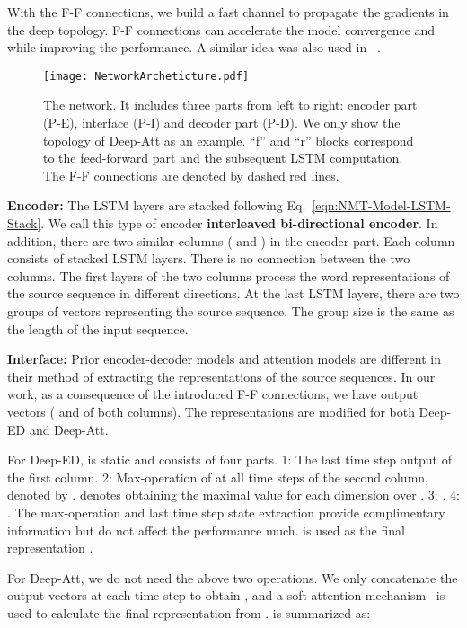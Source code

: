 \documentclass[11pt,letterpaper]{article}
\begin{document}
With the F-F connections, we build a fast channel  to propagate the gradients in the deep topology.  F-F connections can accelerate
the model convergence and while improving the performance. A similar idea was also used in ~\cite{He-Sun-ARXIV2015,Zhou-Xu-ACL2015}.
\begin{figure*}[!htbp]
\begin{center}
\texttt{[image: NetworkArcheticture.pdf]}
\caption{The network. It includes three parts from left to right: encoder part (P-E), interface (P-I) and decoder part (P-D). We only
show the topology of Deep-Att as an example.  ``f'' and ``r'' blocks correspond to the feed-forward part and the subsequent
LSTM computation.    The F-F connections are denoted by dashed red lines.}
\label{fig:NMT-Model-Topology}
\end{center}
\end{figure*}


\noindent\textbf{Encoder:} The LSTM layers are stacked following Eq.~\ref{eqn:NMT-Model-LSTM-Stack}. We call this type of encoder
\textbf{interleaved bi-directional encoder}. In addition, there are two similar columns ( and ) in the encoder part. Each
column consists of  stacked LSTM layers. There is no connection between the two columns. The first layers of the two columns
process the word representations  of the source sequence in different directions. At the last LSTM layers, there are two groups of
vectors representing the source sequence. The group size is the same as the length of the input sequence.

\noindent\textbf{Interface:} Prior encoder-decoder models and attention models are different in their method of
extracting the representations of the source sequences. In our work, as a consequence of the introduced F-F connections, we have 
output vectors ( and  of both columns). The representations are modified for both Deep-ED and Deep-Att.

For Deep-ED,  is static and consists of four \mbox{parts}. 1: The last time step output  of the first column. 2: Max-operation
 of  at \mbox{all} time steps of the second column, denoted by .
 denotes  obtaining the maximal value for each dimension over . 3: . 4:
. The max-operation and last time step state extraction provide complimentary information but do not
affect the performance much.  is  used as the final representation .

For Deep-Att, we do not need the above two operations. We only concatenate the  output vectors at each time step to obtain ,
and a soft attention mechanism~\cite{Bahdanau-Bengio-ICLR2015} is used to calculate the final representation  from .  is
summarized as:
\end{document}
